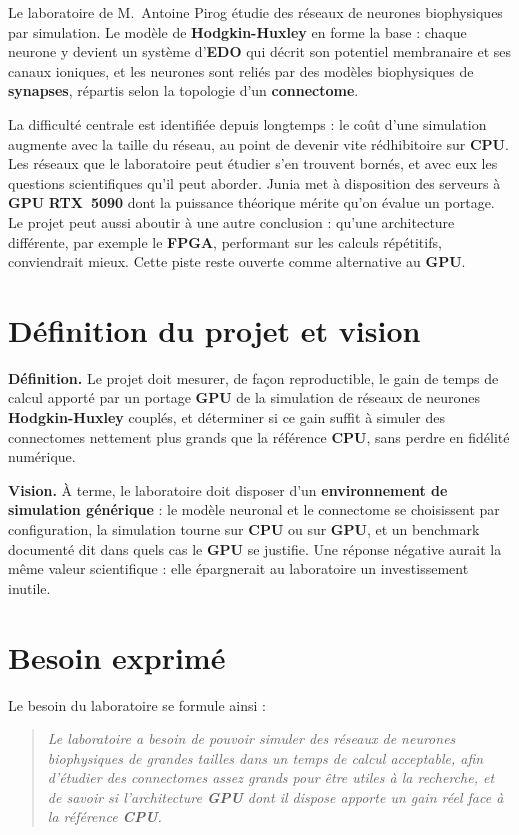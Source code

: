 \documentclass{report}
\begin{document}
Le laboratoire de M.~Antoine Pirog étudie des réseaux de neurones biophysiques par simulation. Le modèle de \textbf{Hodgkin-Huxley} en forme la base : chaque neurone y devient un système d'\textbf{EDO} qui décrit son potentiel membranaire et ses canaux ioniques, et les neurones sont reliés par des modèles biophysiques de \textbf{synapses}, répartis selon la topologie d'un \textbf{connectome}.

La difficulté centrale est identifiée depuis longtemps : le coût d'une simulation augmente avec la taille du réseau, au point de devenir vite rédhibitoire sur \textbf{CPU}. Les réseaux que le laboratoire peut étudier s'en trouvent bornés, et avec eux les questions scientifiques qu'il peut aborder. Junia met à disposition des serveurs à \textbf{GPU} \textbf{RTX~5090} dont la puissance théorique mérite qu'on évalue un portage. Le projet peut aussi aboutir à une autre conclusion : qu'une architecture différente, par exemple le \textbf{FPGA}, performant sur les calculs répétitifs, conviendrait mieux. Cette piste reste ouverte comme alternative au \textbf{GPU}.

\section{Définition du projet et vision}

\textbf{Définition.} Le projet doit mesurer, de façon reproductible, le gain de temps de calcul apporté par un portage \textbf{GPU} de la simulation de réseaux de neurones \textbf{Hodgkin-Huxley} couplés, et déterminer si ce gain suffit à simuler des connectomes nettement plus grands que la référence \textbf{CPU}, sans perdre en fidélité numérique.

\textbf{Vision.} À terme, le laboratoire doit disposer d'un \textbf{environnement de simulation générique} : le modèle neuronal et le connectome se choisissent par configuration, la simulation tourne sur \textbf{CPU} ou sur \textbf{GPU}, et un benchmark documenté dit dans quels cas le \textbf{GPU} se justifie. Une réponse négative aurait la même valeur scientifique : elle épargnerait au laboratoire un investissement inutile.

\section{Besoin exprimé}

Le besoin du laboratoire se formule ainsi :

\begin{quote}
\itshape Le laboratoire a besoin de pouvoir simuler des réseaux de neurones biophysiques de grandes tailles  dans un temps de calcul acceptable, afin d'étudier des connectomes assez grands pour être utiles à la recherche, et de savoir si l'architecture \textbf{GPU} dont il dispose apporte un gain réel face à la référence \textbf{CPU}.
\end{quote}
\end{document}
